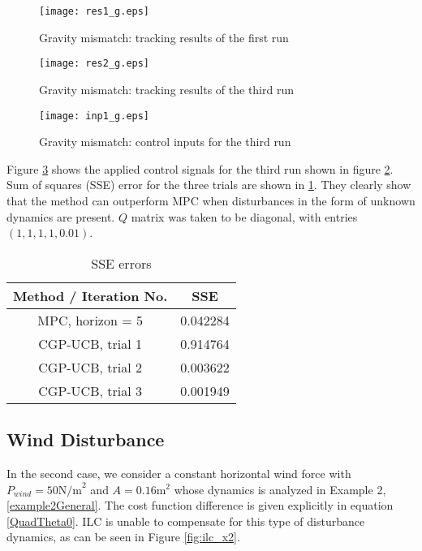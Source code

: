 \begin{figure}
\center	
\texttt{[image: res1\_g.eps]}	
\caption{Gravity mismatch: tracking results of the first run}
\label{fig:res1_g}
\end{figure}

\begin{figure}
\center
\texttt{[image: res2\_g.eps]}	
\caption{Gravity mismatch: tracking results of the third run}
\label{fig:res2_g}
\end{figure}

\begin{figure}
\center
\texttt{[image: inp1\_g.eps]}			
\caption{Gravity mismatch: control inputs for the third run}
\label{fig:inp1_g}
\end{figure}

Figure \ref{fig:inp1_g} shows the applied control signals for the third run shown in figure \ref{fig:res2_g}. Sum of squares (SSE) error for the three trials are shown in \ref{SSE_errors}. They clearly show that the method can outperform MPC when disturbances in the form of unknown dynamics are present. $Q$ matrix was taken to be diagonal, with entries $(1,1,1,1,0.01)$.

\begin{table}[h!t]
\renewcommand{\arraystretch}{1.3}
\caption{SSE errors}
\label{SSE_errors}
\centering
\begin{tabular}{cc}
\textbf{Method / Iteration No.} & SSE \\
\hline
MPC, horizon = 5 & 0.042284 \\
CGP-UCB, trial 1 & 0.914764 \\
CGP-UCB, trial 2 & 0.003622 \\
CGP-UCB, trial 3 & 0.001949 
\end{tabular}
\end{table}

\subsection{Wind Disturbance}
In the second case, we consider a constant horizontal wind force with $P_{wind} = 50 \mathrm{N/m}^{2}$ and $A = 0.16 \mathrm{m}^2$ whose dynamics is analyzed in Example 2, \eqref{example2General}. The cost function difference is given explicitly in equation \eqref{QuadTheta0}. ILC is unable to compensate for this type of disturbance dynamics, as can be seen in Figure \ref{fig:ilc_x2}. 

